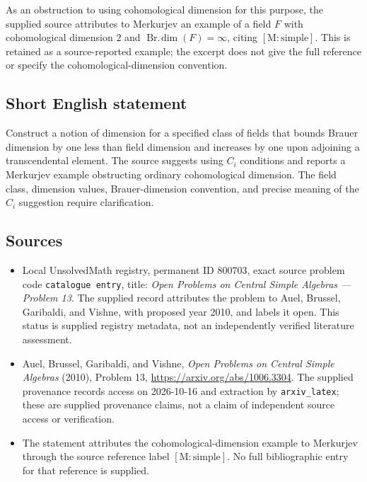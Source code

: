 \documentclass[11pt]{article}
\begin{document}
As an obstruction to using cohomological dimension for this purpose, the supplied source attributes to Merkurjev an example of a field \(F\) with cohomological dimension \(2\) and \(\operatorname{Br.\!dim}(F)=\infty\), citing \([\mathrm{M\!:\!simple}]\). This is retained as a source-reported example; the excerpt does not give the full reference or specify the cohomological-dimension convention.
\subsection{Short English statement}
Construct a notion of dimension for a specified class of fields that bounds Brauer dimension by one less than field dimension and increases by one upon adjoining a transcendental element. The source suggests using \(C_i\) conditions and reports a Merkurjev example obstructing ordinary cohomological dimension. The field class, dimension values, Brauer-dimension convention, and precise meaning of the \(C_i\) suggestion require clarification.
\subsection{Sources}
\begin{itemize}
\item Local UnsolvedMath registry, permanent ID \(800703\), exact source problem code \texttt{catalogue entry}, title: \emph{Open Problems on Central Simple Algebras --- Problem 13}. The supplied record attributes the problem to Auel, Brussel, Garibaldi, and Vishne, with proposed year 2010, and labels it open. This status is supplied registry metadata, not an independently verified literature assessment.
\item Auel, Brussel, Garibaldi, and Vishne, \emph{Open Problems on Central Simple Algebras} (2010), Problem 13, \url{https://arxiv.org/abs/1006.3304}. The supplied provenance records access on 2026-10-16 and extraction by \texttt{arxiv\_latex}; these are supplied provenance claims, not a claim of independent source access or verification.
\item The statement attributes the cohomological-dimension example to Merkurjev through the source reference label \([\mathrm{M\!:\!simple}]\). No full bibliographic entry for that reference is supplied.
\end{itemize}
\end{document}

